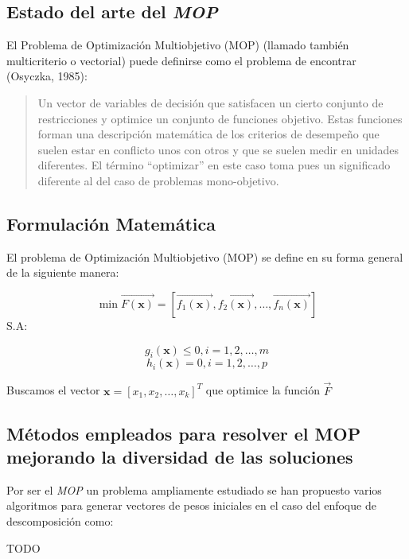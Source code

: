 \documentclass[letterpaper,10pt]{article}
\begin{document}
\subsection{Estado del arte del \emph{MOP}}

El Problema de Optimización Multiobjetivo (MOP) (llamado también
multicriterio o vectorial) puede definirse como el problema de
encontrar (Osyczka, 1985)\cite{Osyczka1985193}:
\begin{quote}
Un vector de variables de decisión que satisfacen un cierto
conjunto de restricciones y optimice un conjunto de funciones
objetivo. Estas funciones forman una descripción matemática
de los criterios de desempeño que suelen estar en conflicto
unos con otros y que se suelen medir en unidades diferentes.
El término ``optimizar'' en este caso toma pues un significado
diferente al del caso de problemas mono-objetivo.
\end{quote}

\subsection{Formulación Matemática}
El problema de Optimización Multiobjetivo (MOP) se define en su forma general de la siguiente manera:
 
$$\min \overrightarrow{F(\bm{x})} = \left[ \overrightarrow{f_1(\bm{x})}, \overrightarrow{f_2(\bm{x})} , \dots, \overrightarrow{f_n(\bm{x})} \right] $$
S.A:
 
$$g_i(\bm{x}) \leq 0, i=1,2,\dots,m$$
$$h_i(\bm{x}) = 0, i=1,2,\dots,p$$
 
Buscamos el vector $\bm{x}=[x_1,x_2,\dots,x_k]^T$ que optimice la función $\overrightarrow{F}$

\newpage
 
\subsection{Métodos empleados para resolver el MOP mejorando la diversidad de las soluciones}

Por ser el \emph{MOP} un problema ampliamente estudiado se han propuesto varios algoritmos para generar vectores de pesos iniciales en el caso del enfoque de descomposición como:
\newline

{\huge TODO}
\end{document}
